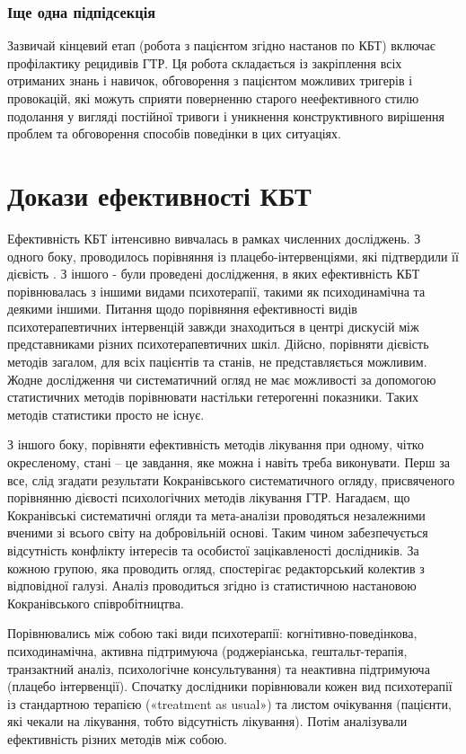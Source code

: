 \documentclass[twocolumn]{article}
\begin{document}
\subsubsection{Іще одна підпідсекція}
\par Зазвичай кінцевий етап (робота з пацієнтом згідно настанов по КБТ) включає профілактику рецидивів ГТР. Ця робота складається із закріплення всіх отриманих знань і навичок, обговорення з пацієнтом можливих тригерів і провокацій, які можуть сприяти поверненню старого неефективного стилю подолання у вигляді постійної тривоги і уникнення конструктивного вирішення проблем та обговорення способів поведінки в цих ситуаціях.
\section{Докази ефективності КБТ}
\par Ефективність КБТ інтенсивно вивчалась в рамках численних досліджень. З одного боку, проводилось порівняння із плацебо-інтервенціями, які підтвердили її дієвість . З іншого - були проведені дослідження, в яких ефективність КБТ порівнювалась з іншими видами психотерапії, такими як психодинамічна та деякими іншими. Питання щодо порівняння ефективності  видів психотерапевтичних інтервенцій завжди знаходиться в центрі дискусій між представниками різних психотерапевтичних шкіл. Дійсно, порівняти дієвість методів загалом, для всіх пацієнтів та станів, не представляється можливим. Жодне дослідження чи систематичний огляд не має можливості за допомогою статистичних методів порівнювати настільки гетерогенні показники. Таких методів статистики просто не існує.
\par З іншого боку, порівняти ефективність методів лікування при одному, чітко окресленому, стані – це завдання, яке можна і навіть треба виконувати. Перш за все, слід згадати результати Кокранівського систематичного огляду, присвяченого порівнянню дієвості психологічних методів лікування ГТР\cite{bib15}. Нагадаєм, що Кокранівські систематичні огляди та мета-аналізи проводяться незалежними вченими зі всього світу на добровільній основі. Таким чином забезпечується відсутність конфлікту інтересів та особистої зацікавленості дослідників. За кожною групою, яка проводить огляд, спостерігає редакторський колектив з відповідної галузі. Аналіз проводиться згідно із статистичною настановою Кокранівського співробітництва.
\par Порівнювались між собою такі види психотерапії: когнітивно-поведінкова, психодинамічна, активна підтримуюча (роджеріанська, гештальт-терапія, транзактний аналіз, психологічне консультування) та неактивна підтримуюча (плацебо інтервенції). Спочатку дослідники порівнювали кожен вид психотерапії із стандартною терапією («treatment as usual») та листом очікування (пацієнти, які чекали на лікування, тобто відсутність лікування). Потім аналізували ефективність різних методів між собою.
\end{document}

